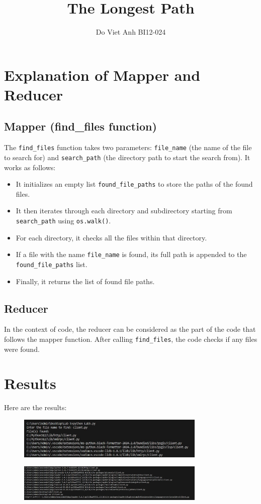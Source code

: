 \documentclass{article}
\title{The Longest Path}
\author{Do Viet Anh BI12-024}
\begin{document}

\section{Explanation of Mapper and Reducer}

\subsection{Mapper (find\_files function)}
The \texttt{find\_files} function takes two parameters: \texttt{file\_name} (the name of the file to search for) and \texttt{search\_path} (the directory path to start the search from). It works as follows:
\begin{itemize}
    \item It initializes an empty list \texttt{found\_file\_paths} to store the paths of the found files.
    \item It then iterates through each directory and subdirectory starting from \texttt{search\_path} using \texttt{os.walk()}.
    \item For each directory, it checks all the files within that directory.
    \item If a file with the name \texttt{file\_name} is found, its full path is appended to the \texttt{found\_file\_paths} list.
    \item Finally, it returns the list of found file paths.
\end{itemize}

\subsection{Reducer}
In the context of code, the reducer can be considered as the part of the code that follows the mapper function. After calling \texttt{find\_files}, the code checks if any files were found.

\section{Results}

Here are the results:

\begin{figure}[h]
  \centering
  \includegraphics[width=0.8\textwidth]{lab5-1.png}
\end{figure}

\begin{figure}[h]
  \centering
  \includegraphics[width=0.8\textwidth]{lab5-2.png}
\end{figure}
\end{document}
